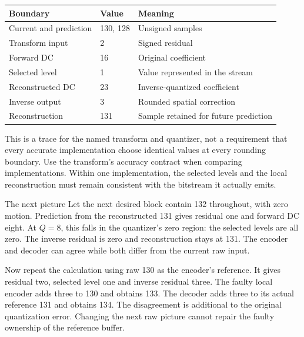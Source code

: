 \begin{center}
  \begin{tabular}{lll}
    \toprule
    Boundary               & Value    & Meaning                               \\
    \midrule
    Current and prediction & 130, 128 & Unsigned samples                      \\
    Transform input        & 2        & Signed residual                       \\
    Forward DC             & 16       & Original coefficient                  \\
    Selected level         & 1        & Value represented in the stream       \\
    Reconstructed DC       & 23       & Inverse-quantized coefficient         \\
    Inverse output         & 3        & Rounded spatial correction            \\
    Reconstruction         & 131      & Sample retained for future prediction \\
    \bottomrule
  \end{tabular}
\end{center}

This is a trace for the named transform and quantizer, not a requirement that
every accurate implementation choose identical values at every rounding boundary.
Use the transform's accuracy contract when comparing implementations. Within one
implementation, the selected levels and the local reconstruction must remain
consistent with the bitstream it actually emits.

\begin{MARSWorkedExample}{The next picture}
  Let the next desired block contain 132 throughout, with zero motion. Prediction
  from the reconstructed 131 gives residual one and forward DC eight. At $Q=8$,
  this falls in the quantizer's zero region: the selected levels are all zero.
  The inverse residual is zero and reconstruction stays at 131. The encoder and
  decoder can agree while both differ from the current raw input.

  Now repeat the calculation using raw 130 as the encoder's reference. It gives
  residual two, selected level one and inverse residual three. The faulty local
  encoder adds three to 130 and obtains 133. The decoder adds three to its actual
  reference 131 and obtains 134. The disagreement is additional to the original
  quantization error. Changing the next raw picture cannot repair the faulty
  ownership of the reference buffer.
\end{MARSWorkedExample}

